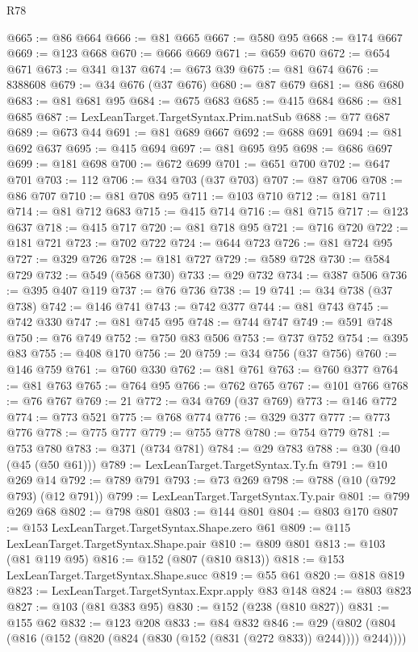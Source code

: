 \begin{lexlean}{R78}
\begin{coremodule}
@665 := @86 @664
@666 := @81 @665
@667 := @580 @95
@668 := @174 @667
@669 := @123 @668
@670 := @666 @669
@671 := @659 @670
@672 := @654 @671
@673 := @341 @137
@674 := @673 @39
@675 := @81 @674
@676 := 8388608
@679 := @34 @676 (@37 @676)
@680 := @87 @679
@681 := @86 @680
@683 := @81 @681 @95
@684 := @675 @683
@685 := @415 @684
@686 := @81 @685
@687 := LexLeanTarget.TargetSyntax.Prim.natSub
@688 := @77 @687
@689 := @673 @44
@691 := @81 @689 @667
@692 := @688 @691
@694 := @81 @692 @637
@695 := @415 @694
@697 := @81 @695 @95
@698 := @686 @697
@699 := @181 @698
@700 := @672 @699
@701 := @651 @700
@702 := @647 @701
@703 := 112
@706 := @34 @703 (@37 @703)
@707 := @87 @706
@708 := @86 @707
@710 := @81 @708 @95
@711 := @103 @710
@712 := @181 @711
@714 := @81 @712 @683
@715 := @415 @714
@716 := @81 @715
@717 := @123 @637
@718 := @415 @717
@720 := @81 @718 @95
@721 := @716 @720
@722 := @181 @721
@723 := @702 @722
@724 := @644 @723
@726 := @81 @724 @95
@727 := @329 @726
@728 := @181 @727
@729 := @589 @728
@730 := @584 @729
@732 := @549 (@568 @730)
@733 := @29 @732
@734 := @387 @506
@736 := @395 @407 @119
@737 := @76 @736
@738 := 19
@741 := @34 @738 (@37 @738)
@742 := @146 @741
@743 := @742 @377
@744 := @81 @743
@745 := @742 @330
@747 := @81 @745 @95
@748 := @744 @747
@749 := @591 @748
@750 := @76 @749
@752 := @750 @83 @506
@753 := @737 @752
@754 := @395 @83
@755 := @408 @170
@756 := 20
@759 := @34 @756 (@37 @756)
@760 := @146 @759
@761 := @760 @330
@762 := @81 @761
@763 := @760 @377
@764 := @81 @763
@765 := @764 @95
@766 := @762 @765
@767 := @101 @766
@768 := @76 @767
@769 := 21
@772 := @34 @769 (@37 @769)
@773 := @146 @772
@774 := @773 @521
@775 := @768 @774
@776 := @329 @377
@777 := @773 @776
@778 := @775 @777
@779 := @755 @778
@780 := @754 @779
@781 := @753 @780
@783 := @371 (@734 @781)
@784 := @29 @783
@788 := @30 (@40 (@45 (@50 @61)))
@789 := LexLeanTarget.TargetSyntax.Ty.fn
@791 := @10 @269 @14
@792 := @789 @791
@793 := @73 @269
@798 := @788 (@10 (@792 @793) (@12 @791))
@799 := LexLeanTarget.TargetSyntax.Ty.pair
@801 := @799 @269 @68
@802 := @798 @801
@803 := @144 @801
@804 := @803 @170
@807 := @153 LexLeanTarget.TargetSyntax.Shape.zero @61
@809 := @115 LexLeanTarget.TargetSyntax.Shape.pair
@810 := @809 @801
@813 := @103 (@81 @119 @95)
@816 := @152 (@807 (@810 @813))
@818 := @153 LexLeanTarget.TargetSyntax.Shape.succ
@819 := @55 @61
@820 := @818 @819
@823 := LexLeanTarget.TargetSyntax.Expr.apply @83 @148
@824 := @803 @823
@827 := @103 (@81 @383 @95)
@830 := @152 (@238 (@810 @827))
@831 := @155 @62
@832 := @123 @208
@833 := @84 @832
@846 := @29 (@802 (@804 (@816 (@152 (@820 (@824 (@830 (@152 (@831 (@272 @833)) @244)))) @244))))

\end{coremodule}
\end{lexlean}
